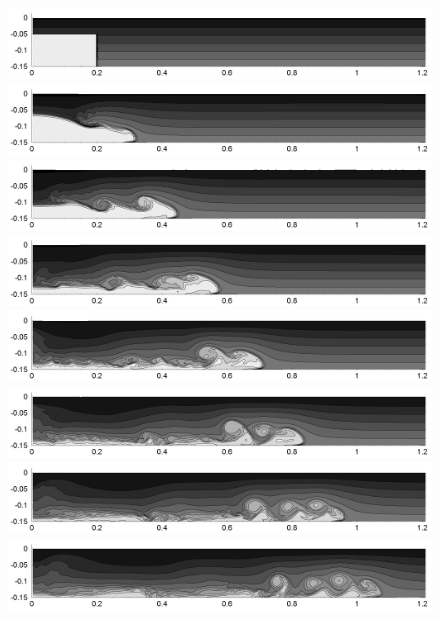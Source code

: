 \begin{figure}[htbp]
  \begin{center}    \includegraphics[scale=0.55]{../figures/Staggered/Fig9case/060519b-Euler-dt-000234375-280-120/01.png}    \includegraphics[scale=0.55]{../figures/Staggered/Fig9case/060519b-Euler-dt-000234375-280-120/02.png}
\includegraphics[scale=0.55]{../figures/Staggered/Fig9case/060519b-Euler-dt-000234375-280-120/03.png}
\includegraphics[scale=0.55]{../figures/Staggered/Fig9case/060519b-Euler-dt-000234375-280-120/04.png}    \includegraphics[scale=0.55]{../figures/Staggered/Fig9case/060519b-Euler-dt-000234375-280-120/05.png}
\includegraphics[scale=0.55]{../figures/Staggered/Fig9case/060519b-Euler-dt-000234375-280-120/06.png}
\includegraphics[scale=0.55]{../figures/Staggered/Fig9case/060519b-Euler-dt-000234375-280-120/07.png}    \includegraphics[scale=0.55]{../figures/Staggered/Fig9case/060519b-Euler-dt-000234375-280-120/08.png}

\end{center}
\end{figure}

